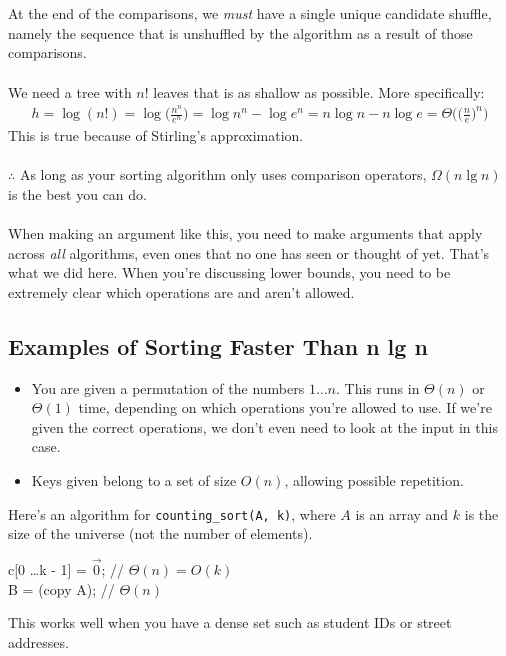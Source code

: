 \documentclass[]{article}
\theoremstyle{definition}
\begin{document}
			\\ \\
			At the end of the comparisons, we \emph{must} have a single unique candidate shuffle, namely the sequence that is unshuffled by the algorithm as a result of those comparisons.
			\\ \\
			We need a tree with $n!$ leaves that is as shallow as possible. More specifically:
			\begin{align*}
				h = \log(n!) = \log\big(\frac{n^n}{e^n}) = \log n^n - \log e^n = n \log n - n \log e = \Theta\big(\big(\frac{n}{e}\big)^n\big)
			\end{align*}
			This is true because of Stirling's approximation.
			\\ \\
			$\therefore$ As long as your sorting algorithm only uses comparison operators, $\Omega(n \lg n)$ is the best you can do.
			\\ \\
			When making an argument like this, you need to make arguments that apply across \emph{all} algorithms, even ones that no one has seen or thought of yet. That's what we did here. When you're discussing lower bounds, you need to be extremely clear which operations are and aren't allowed.
			\subsection{Examples of Sorting Faster Than n lg n}
				\begin{itemize}
					\item You are given a permutation of the numbers $1 \ldots n$. This runs in $\Theta(n)$ or $\Theta(1)$ time, depending on which operations you're allowed to use. If we're given the correct operations, we don't even need to look at the input in this case.
					\item Keys given belong to a set of size $O(n)$, allowing possible repetition.
				\end{itemize}

				Here's an algorithm for \verb+counting_sort(A, k)+, where $A$ is an array and $k$ is the size of the universe (not the number of elements). \\
				\begin{algorithm}[H]
					c[0 \ldots k - 1] = $\vec 0$; // $\Theta(n) = O(k)$ \\
					B = (copy A); // $\Theta(n)$ \\
				\end{algorithm}
				This works well when you have a dense set such as student IDs or street addresses.
\end{document}
